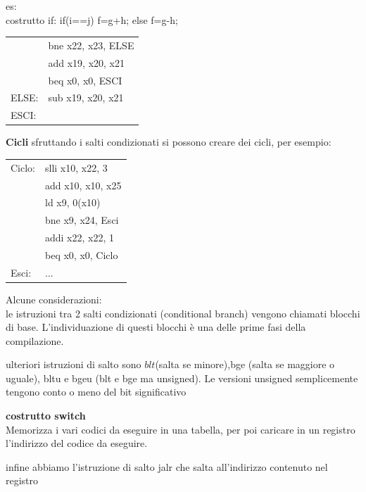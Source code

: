 \documentclass[12pt, a4paper]{article}
\begin{document}
es:\\
costrutto if: if(i==j) f=g+h; else f=g-h;

\begin{tabular}{l l}
     &bne x22, x23, ELSE \\
     &   add x19, x20, x21   \\
     &  beq x0, x0, ESCI\\
ELSE:& sub x19, x20, x21\\
ESCI:&
\end{tabular}

\newpage

\textbf{Cicli}
sfruttando i salti condizionati si possono creare dei cicli, per esempio:

\begin{tabular}{l l}
Ciclo: &slli x10, x22, 3\\
       &add x10, x10, x25\\
       &ld x9, 0(x10)\\
       &bne x9, x24, Esci\\   
       &addi x22, x22, 1\\
       &beq x0, x0, Ciclo\\
Esci:  &...
\end{tabular}

Alcune considerazioni:\\
le istruzioni tra 2 salti condizionati (conditional branch) vengono chiamati blocchi di base.
L'individuazione di questi blocchi è una delle prime fasi della compilazione.

ulteriori istruzioni di salto sono $blt$(salta se minore),bge (salta se maggiore o uguale),
bltu e bgeu (blt e bge ma unsigned). Le versioni unsigned semplicemente tengono conto
o meno del bit significativo

\textbf{costrutto switch}\\
Memorizza i vari codici da eseguire in una tabella, per poi caricare in un registro 
l'indirizzo del codice da eseguire.

infine abbiamo l'istruzione di salto jalr che salta all'indirizzo contenuto nel registro

\newpage
\end{document}
